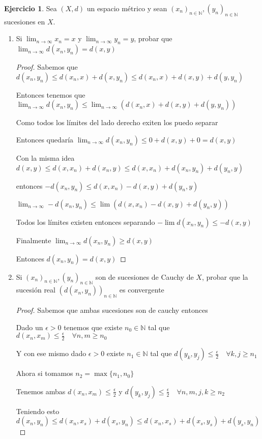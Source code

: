 \documentclass[12pt]{report}
\newcommand{\N}{\mathbb{N}}
\newcommand{\ra}{\rightarrow}
\theoremstyle{definition}
\newtheorem{ej}{Ejercicio}
\begin{document}
\begin{ej}
  Sea $(X,d)$ un espacio métrico y sean $(x_n)_{n \in \N}, (y_n)_{n \in \N}$ sucesiones en $X$.
  \begin{enumerate}
	  \item Si $\lim_{n\ra\infty} x_n = x$ y $\lim_{n\ra\infty} y_n = y$, probar que $\lim_{n \ra \infty} d(x_n,y_n) = d(x,y)$ 
      \begin{proof}
	Sabemos que $d(x_n , y_n) \leq d(x_n,x) + d(x,y_n) \leq d(x_n,x) + d(x,y) + d(y,y_n)$

	Entonces tenemos que $\lim_{n \ra \infty} d(x_n,y_n) \leq \lim_{n \ra \infty}{(d(x_n,x) + d(x,y) + d(y,y_n))}$

	Como todos los límites del lado derecho exiten los puedo separar

	Entonces quedaría $\lim_{n\ra\infty} d(x_n,y_n) \leq 0 + d(x,y) + 0= d(x,y)$

	Con la misma idea $d(x,y) \leq d(x,x_n) + d(x_n,y) \leq d(x,x_n) + d(x_n,y_n) + d(y_n ,y)$

	entonces $- d(x_n,y_n) \leq d(x,x_n) - d(x,y) + d(y_n,y)$

	$\lim_{n\ra\infty} - d(x_n,y_n) \leq \lim (d(x,x_n) - d(x,y) + d(y_n,y)) $ 

	Todos los límites existen entonces separando $-\lim d(x_n,y_n) \leq -d(x,y)$

	Finalmente $\lim_{n\ra\infty} d(x_n,y_n) \geq d(x,y)$

	Entonces $d(x_n,y_n) = d(x,y)$
      \end{proof}
    \item Si $(x_n)_{n \in \N}, (y_n)_{n \in \N}$ son de sucesiones de Cauchy de $X$, probar que la sucesión real $(d(x_n,y_n))_{n \in \N}$ es convergente
      \begin{proof}
	Sabemos que ambas sucesiones son de cauchy entonces 

	Dado un $\epsilon > 0$ tenemos que existe $n_0 \in \N$ tal que $d(x_n,x_m) \leq \frac{\epsilon}{2} \quad \forall n,m \geq n_0$

	Y con ese mismo dado $\epsilon > 0$ existe $n_1\in \N$ tal que $d(y_k,y_j) \leq \frac{\epsilon}{2} \quad \forall k,j\geq n_1 $

	Ahora si tomamos $n_2 = \max{\{n_1 ,n_0\}}$

	Tenemos ambas $d(x_n,x_m) \leq \frac{\epsilon}{2}$ y $d(y_k,y_j) \leq \frac{\epsilon}{2} \quad \forall n,m,j,k \geq n_2$


	Teniendo esto $d(x_n,y_n) \leq d(x_n ,x_{s}) + d(x_{s},y_n) \leq d(x_n,x_{s}) + d(x_{s},y_{s}) + d(y_{s},y_n)$


\end{proof}
\end{enumerate}
\end{ej}
\end{document}
